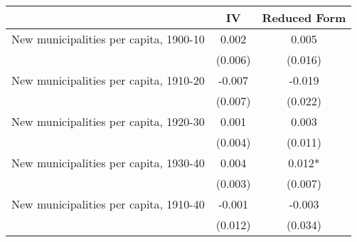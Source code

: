  \begin{tabular}{l*{2}{c}} \toprule
                &\multicolumn{1}{c}{IV}&\multicolumn{1}{c}{Reduced Form}\\
\midrule
New municipalities per capita, 1900-10&    0.002   &    0.005   \\
                &  (0.006)   &  (0.016)   \\
\addlinespace
New municipalities per capita, 1910-20&   -0.007   &   -0.019   \\
                &  (0.007)   &  (0.022)   \\
\addlinespace
New municipalities per capita, 1920-30&    0.001   &    0.003   \\
                &  (0.004)   &  (0.011)   \\
\addlinespace
New municipalities per capita, 1930-40&    0.004   &    0.012*  \\
                &  (0.003)   &  (0.007)   \\
\addlinespace
New municipalities per capita, 1910-40&   -0.001   &   -0.003   \\
                &  (0.012)   &  (0.034)   \\
 \bottomrule \end{tabular}
